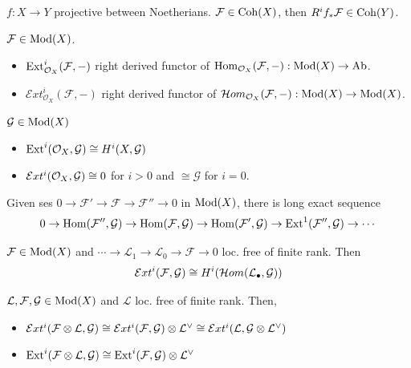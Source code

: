 \begin{proposition} $f: X \to Y$ projective between Noetherians. $\mathcal{F} \in \operatorname{Coh}(X)$, then $R^if_*\mathcal{F} \in \operatorname{Coh}(Y)$.
\end{proposition}

\begin{definition}[Homs] $\mathcal{F} \in \operatorname{Mod}(X)$. 
\begin{itemize}[topsep=-6pt, itemsep=0pt]
    \item $\operatorname{Ext}_{\mathcal{O}_X }^i (\mathcal{F}, -)$ right derived functor of $\operatorname{Hom}_{\mathcal{O}_X}(\mathcal{F}, -) : \operatorname{Mod}(X) \to \operatorname{Ab}$.
    \item $\mathcal{E}xt_{\mathcal{O}_X }^i (\mathcal{F}, -)$ right derived functor of $\mathcal{H}om_{\mathcal{O}_X}(\mathcal{F}, -) : \operatorname{Mod}(X) \to \operatorname{Mod}(X)$.
\end{itemize}
\end{definition}

\begin{proposition} $\mathcal{G} \in \operatorname{Mod}(X)$
\begin{itemize}[topsep=-6pt, itemsep=0pt]
    \item $\operatorname{Ext}^i(\mathcal{O}_X, \mathcal{G}) \cong H^i(X, \mathcal{G})$
    \item $\mathcal{E}xt ^i(\mathcal{O}_X, \mathcal{G}) \cong 0$ for $i > 0$ and $\cong \mathcal{G}$ for $i = 0$.
\end{itemize} 
\end{proposition}

\begin{proposition} Given ses $ 0 \to \mathcal{F'} \to \mathcal{F} \to \mathcal{F''} \to 0$ in $\operatorname{Mod}(X)$, there is long exact sequence
\[
0 \to \operatorname{Hom}(\mathcal{F''}, \mathcal{G}) \to \operatorname{Hom}(\mathcal{F}, \mathcal{G}) \to \operatorname{Hom}(\mathcal{F'}, \mathcal{G}) \to \operatorname{Ext}^1(\mathcal{F''}, \mathcal{G}) \to \cdots
\]
\end{proposition}

\begin{proposition} $\mathcal{F} \in \operatorname{Mod}(X)$ and $ \cdots \to \mathcal{L}_1 \to \mathcal{L}_0 \to \mathcal{F} \to 0$ loc. free of finite rank. Then
\[
\mathcal{E}xt^i(\mathcal{F}, \mathcal{G}) \cong H^i(\mathcal{H}om(\mathcal{L}_{\bullet}, \mathcal{G}))
\]
\end{proposition}

\begin{proposition} $\mathcal{L}, \mathcal{F}, \mathcal{G} \in \operatorname{Mod}(X) $ and $\mathcal{L}$ loc. free of finite rank. Then,
\begin{itemize}[topsep=-6pt, itemsep=0pt]
    \item $\mathcal{E}xt ^i(\mathcal{F} \otimes \mathcal{L}, \mathcal{G}) \cong \mathcal{E}xt^i(\mathcal{F}, \mathcal{G}) \otimes \mathcal{L}^{\vee} \cong \mathcal{E}xt ^i (\mathcal{L}, \mathcal{G} \otimes \mathcal{L}^{\vee})$
    \item $\operatorname{Ext}^i (\mathcal{F} \otimes \mathcal{L}, \mathcal{G}) \cong \operatorname{Ext}^i(\mathcal{F}, \mathcal{G}) \otimes \mathcal{L}^{\vee}$
\end{itemize}
\end{proposition}

